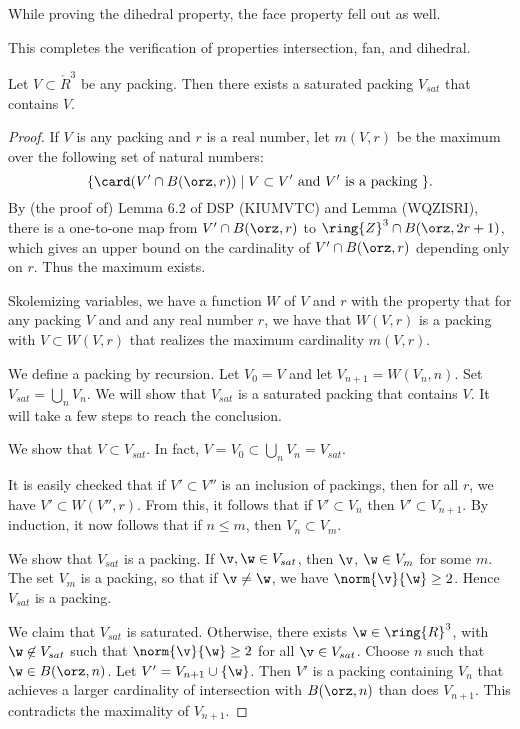 While proving the dihedral property, the face property fell out as well.

This completes the verification of properties intersection, fan, and dihedral.

\newpage


\begin{lemma}  Let $V\subset\ring{R}^3$ be any packing.  
Then there exists a saturated packing $V_{sat}$ that contains $V$.
\end{lemma}

\begin{proof}
If $V$ is any packing and $r$ is a real number, let $m(V,r)$ be the maximum over the following
set of natural numbers:
\[
\{ \card(V'\cap B(\orz,r)) \mid V \subset V' \text{ and } V' \text{ is a packing } \}.
\]
By (the proof of) Lemma 6.2 of DSP  (KIUMVTC) and Lemma (WQZISRI), there is a one-to-one map from
$V'\cap B(\orz,r)$ to $\ring{Z}^3\cap B(\orz,2r+1)$, which gives an upper bound on the cardinality
of $V'\cap B(\orz,r)$ depending only on $r$.  Thus the maximum exists.

Skolemizing variables, we have a function $W$ of $V$ and $r$ with the property that for any
packing $V$ and and any real number $r$, we have that $W(V,r)$ is a packing with $V \subset W(V,r)$ that
realizes the maximum cardinality $m(V,r)$.

We define a packing by recursion.
Let $V_0 = V$ and let $V_{n+1} = W(V_n,n)$.  Set $V_{sat}= \bigcup_n V_n$.  We will show that $V_{sat}$ is
a saturated packing that contains $V$.   It will take a few steps to reach the conclusion.

We show that $V\subset V_{sat}$.  In fact, $V = V_0 \subset \bigcup_n V_n = V_{sat}$.

It is easily checked that if $V' \subset V''$ is an inclusion of packings, then for all $r$, we have $V' \subset W(V'',r)$.
From this, it follows that if $V' \subset V_n$ then $V' \subset V_{n+1}$.
By induction, it now follows that if $n \le m$, then $V_n \subset V_m$.

We show that $V_{sat}$ is a packing.
If $\v,\w\in V_{sat}$, then $\v$, $\w\in V_m$ for some $m$.  The set $V_m$ is a packing, so that
if $\v\ne\w$, we have $\norm{\v}{\w}\ge 2$.  Hence $V_{sat}$ is a packing.


We claim that $V_{sat}$ is saturated.  Otherwise, there exists $\w\in\ring{R}^3$, with $\w\not\in V_{sat}$ such that
$\norm{\v}{\w}\ge 2$ for all $\v\in V_{sat}$.   Choose $n$ such that $\w\in B(\orz,n)$.
Let $V' = V_{n+1} \cup \{\w\}$.  Then $V'$ is a packing containing $V_n$
that achieves a larger cardinality of intersection
with $B(\orz,n)$ than does $V_{n+1}$.  This contradicts the maximality of $V_{n+1}$.
\end{proof}

